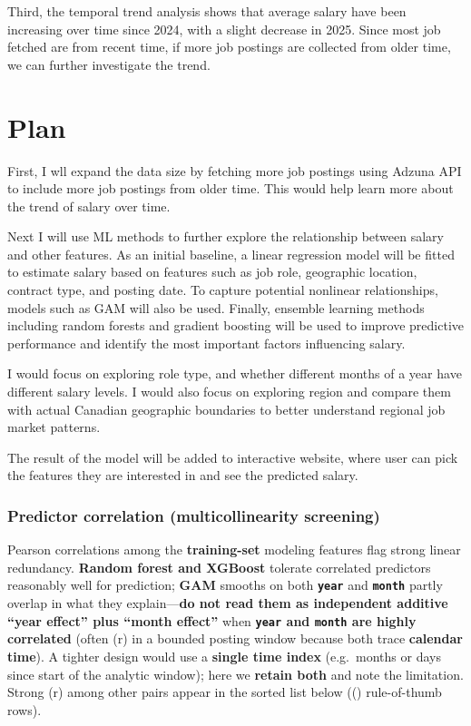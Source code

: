 \documentclass[
  letterpaper,
  DIV=11,
  numbers=noendperiod]{scrartcl}
\begin{document}
Third, the temporal trend analysis shows that average salary have been
increasing over time since 2024, with a slight decrease in 2025. Since
most job fetched are from recent time, if more job postings are
collected from older time, we can further investigate the trend.

\section{Plan}\label{plan}

First, I wll expand the data size by fetching more job postings using
Adzuna API to include more job postings from older time. This would help
learn more about the trend of salary over time.

Next I will use ML methods to further explore the relationship between
salary and other features. As an initial baseline, a linear regression
model will be fitted to estimate salary based on features such as job
role, geographic location, contract type, and posting date. To capture
potential nonlinear relationships, models such as GAM will also be used.
Finally, ensemble learning methods including random forests and gradient
boosting will be used to improve predictive performance and identify the
most important factors influencing salary.

I would focus on exploring role type, and whether different months of a
year have different salary levels. I would also focus on exploring
region and compare them with actual Canadian geographic boundaries to
better understand regional job market patterns.

The result of the model will be added to interactive website, where user
can pick the features they are interested in and see the predicted
salary.

\subsubsection{Predictor correlation (multicollinearity
screening)}\label{predictor-correlation-multicollinearity-screening}

Pearson correlations among the \textbf{training-set} modeling features
flag strong linear redundancy. \textbf{Random forest and XGBoost}
tolerate correlated predictors reasonably well for prediction;
\textbf{GAM} smooths on both \textbf{\texttt{year}} and
\textbf{\texttt{month}} partly overlap in what they explain---\textbf{do
not read them as independent additive ``year effect'' plus ``month
effect''} when \textbf{\texttt{year} and \texttt{month} are highly
correlated} (often (\textbar r\textbar{}) in a bounded
posting window because both trace \textbf{calendar time}). A tighter
design would use a \textbf{single time index} (e.g.~months or days since
start of the analytic window); here we \textbf{retain both} and note the
limitation. Strong (\textbar r\textbar) among other pairs appear in the
sorted list below (() rule-of-thumb rows).
\end{document}
